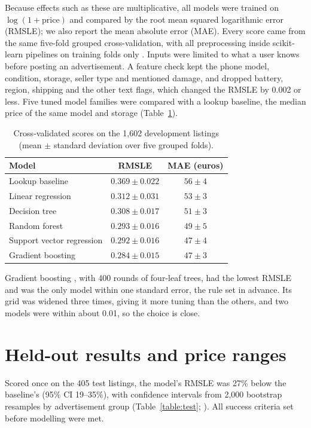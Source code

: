 Because effects such as these are multiplicative, all models were trained on $\log(1+\text{price})$ and compared by the root mean squared logarithmic error (RMSLE); we also report the mean absolute error (MAE). Every score came from the same five-fold grouped cross-validation, with all preprocessing inside scikit-learn pipelines on training folds only \parencite{pedregosa2011scikit}. Inputs were limited to what a user knows before posting an advertisement. A feature check kept the phone model, condition, storage, seller type and mentioned damage, and dropped battery, region, shipping and the other text flags, which changed the RMSLE by 0.002 or less. Five tuned model families were compared with a lookup baseline, the median price of the same model and storage (Table~\ref{table:cv}).

\begin{table}[ht!]
\centering
\begin{tabular}{l c c}
\toprule
Model & RMSLE & MAE (euros) \\
\midrule
Lookup baseline & $0.369 \pm 0.022$ & $56 \pm 4$ \\
Linear regression & $0.312 \pm 0.031$ & $53 \pm 3$ \\
Decision tree & $0.308 \pm 0.017$ & $51 \pm 3$ \\
Random forest & $0.293 \pm 0.016$ & $49 \pm 5$ \\
Support vector regression & $0.292 \pm 0.016$ & $47 \pm 4$ \\
Gradient boosting & $0.284 \pm 0.015$ & $47 \pm 3$ \\
\bottomrule
\end{tabular}
\caption{Cross-validated scores on the 1,602 development listings (mean $\pm$ standard deviation over five grouped folds).}
\label{table:cv}
\end{table}

Gradient boosting \parencite{friedman2001greedy}, with 400 rounds of four-leaf trees, had the lowest RMSLE and was the only model within one standard error, the rule set in advance. Its grid was widened three times, giving it more tuning than the others, and two models were within about 0.01, so the choice is close.

\section{Held-out results and price ranges}

Scored once on the 405 test listings, the model's RMSLE was 27\% below the baseline's (95\% CI 19--35\%), with confidence intervals from 2,000 bootstrap resamples by advertisement group (Table~\ref{table:test}; \cite{efron1993introduction}). All success criteria set before modelling were met.

